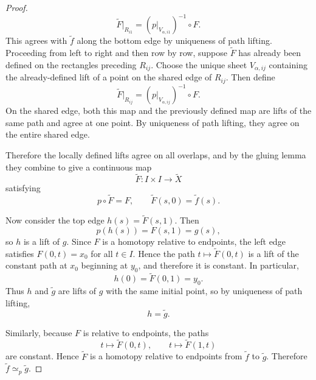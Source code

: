 \begin{proof}
		\begin{equation}
			\widetilde{F}|_{R_{i1}} = \left(p|_{V_{\alpha,i1}}\right)^{-1}\circ F.
		\end{equation}
		This agrees with $\widetilde{f}$ along the bottom edge by uniqueness of path lifting. Proceeding from left to right and then row by row, suppose $\widetilde{F}$ has already been defined on the rectangles preceding $R_{ij}$. Choose the unique sheet $V_{\alpha,ij}$ containing the already-defined lift of a point on the shared edge of $R_{ij}$. Then define
		\begin{equation}
			\widetilde{F}|_{R_{ij}} = \left(p|_{V_{\alpha,ij}}\right)^{-1}\circ F.
		\end{equation}
		On the shared edge, both this map and the previously defined map are lifts of the same path and agree at one point. By uniqueness of path lifting, they agree on the entire shared edge.

		Therefore the locally defined lifts agree on all overlaps, and by the gluing lemma they combine to give a continuous map
		\begin{equation}
			\widetilde{F}:I\times I\to\widetilde{X}
		\end{equation}
		satisfying
		\begin{equation}
			p\circ\widetilde{F}=F,
			\qquad
			\widetilde{F}(s,0)=\widetilde{f}(s).
		\end{equation}

		Now consider the top edge $h(s)=\widetilde{F}(s,1)$. Then
		\begin{equation}
			p(h(s)) = F(s,1) = g(s),
		\end{equation}
		so $h$ is a lift of $g$. Since $F$ is a homotopy relative to endpoints, the left edge satisfies $F(0,t)=x_0$ for all $t\in I$. Hence the path $t\mapsto \widetilde{F}(0,t)$ is a lift of the constant path at $x_0$ beginning at $y_0$, and therefore it is constant. In particular,
		\begin{equation}
			h(0)=\widetilde{F}(0,1)=y_0.
		\end{equation}
		Thus $h$ and $\widetilde{g}$ are lifts of $g$ with the same initial point, so by uniqueness of path lifting,
		\begin{equation}
			h=\widetilde{g}.
		\end{equation}

		Similarly, because $F$ is relative to endpoints, the paths
		\begin{equation}
			t\mapsto \widetilde{F}(0,t), \qquad t\mapsto \widetilde{F}(1,t)
		\end{equation}
		are constant. Hence $\widetilde{F}$ is a homotopy relative to endpoints from $\widetilde{f}$ to $\widetilde{g}$. Therefore $\widetilde{f}\simeq_p \widetilde{g}$.
	\end{proof}

